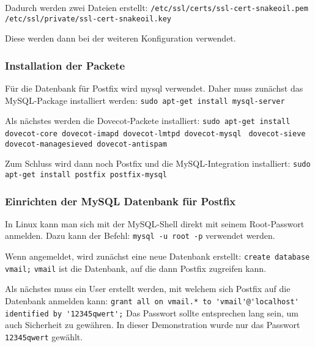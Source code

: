 Dadurch werden zwei Dateien erstellt: \newline
\verb|/etc/ssl/certs/ssl-cert-snakeoil.pem| \newline
\verb|/etc/ssl/private/ssl-cert-snakeoil.key| \newline

Diese werden dann bei der weiteren Konfiguration verwendet.

\subsubsection{Installation der Packete}


Für die Datenbank für Postfix wird mysql verwendet. Daher muss zunächst das MySQL-Package installiert werden:\newline
\verb|sudo apt-get install mysql-server|

Als nächstes werden die Dovecot-Packete installiert:\newline
\verb|sudo apt-get install dovecot-core dovecot-imapd dovecot-lmtpd dovecot-mysql |\newline
\verb|dovecot-sieve dovecot-managesieved dovecot-antispam|\newline

Zum Schluss wird dann noch Postfix und die MySQL-Integration installiert: \newline
\verb|sudo apt-get install postfix postfix-mysql|

\subsubsection{Einrichten der MySQL Datenbank für Postfix}
In Linux kann man sich mit der MySQL-Shell direkt mit seinem Root-Passwort anmelden. Dazu kann der Befehl:\newline
\verb|mysql -u root -p|\newline
verwendet werden.

Wenn angemeldet, wird zunächst eine neue Datenbank erstellt:\newline
\verb|create database vmail;|\newline
\verb|vmail| ist die Datenbank, auf die dann Postfix zugreifen kann.

Als nächstes muss ein User erstellt werden, mit welchem sich Postfix auf die Datenbank anmelden kann:\newline
\verb|grant all on vmail.* to 'vmail'@'localhost' identified by '12345qwert';|\newline
Das Passwort sollte entsprechen lang sein, um auch Sicherheit zu gewähren. In dieser Demonstration wurde nur das Passwort \verb|12345qwert| gewählt.

